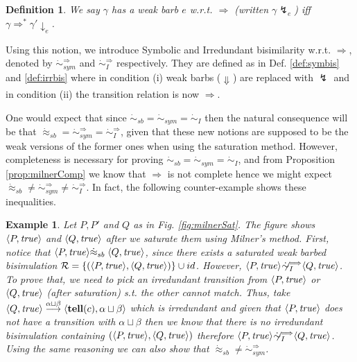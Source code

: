 \documentclass[copyright,creativecommons]{eptcs}
\newcommand{\tellp}[1]{\tell(#1)}
\newcommand{\true}{{\it true}}
\newcommand{\tell}{{\bf tell}}
\newcommand{\rrarrow}{\longrightarrow}
\newcommand{\pairccp}[2]{\langle #1,#2 \rangle}
\newcommand{\trans}[1]{\stackrel{#1}{\rrarrow}}
\newcommand{\barb}[1]{\downarrow_{#1}}
\newcommand{\wbarb}[1]{\Downarrow_{#1}}
\newcommand{\wsatbis}{\dot{\approx}_{sb}}
\newcommand{\satstbisim}{\dot{\sim}_{sb}}
\newtheorem{definition}{Definition}
\newtheorem{example}{Example}
\newcommand{\newtrans}[1]{\stackrel{#1}{\Longrightarrow}}
\newcommand{\newreds}{\Longrightarrow^*}
\newcommand{\genbarb}[1]{\lightning_{#1}}
\newcommand{\G}{\gamma}
\newcommand{\conf}[2]{\pairccp{#1}{#2}}
\newcommand{\irrbis}{\dot{\sim}_{I}}
\newcommand{\symbis}{\dot{\sim}_{sym}}
\newcommand{\newirrbis}{\dot{\sim}^{\newtrans{}}_{I}}
\newcommand{\newsymbis}{\dot{\sim}^{\newtrans{}}_{sym}}
\newcommand{\nonewirrbis}{\not \!\!\! \newirrbis}
\begin{document}
\begin{definition}
We say $\G$ has a weak barb $e$ w.r.t. $\newtrans{}$
(written $\G \genbarb{e}$) iff $\G \newreds \G' \barb{e}$.
\end{definition}




Using this notion, we introduce Symbolic and Irredundant bisimilarity
w.r.t. $\newtrans{}$, denoted by $\newsymbis$ and $\newirrbis$ respectively.
They are defined as in Def. \ref{def:symbis} and \ref{def:irrbis} where in
condition (i) weak barbs ($\wbarb{}$) are replaced with $\genbarb{}$ and in
condition (ii) the transition relation is now $\newtrans{}$.

One would expect that since $\satstbisim = \symbis = \irrbis$ then
the natural consequence will be that $\wsatbis = \newsymbis = \newirrbis$,
given that these new notions are supposed to be the weak versions of the former ones
when using the saturation method.
However, completeness is necessary for proving $\satstbisim = \symbis = \irrbis$,
and from Proposition \ref{prop:milnerComp} we know that $\newtrans{}$ is not complete
hence we might expect $\wsatbis \neq \newsymbis \neq \newirrbis$.
In fact, the following counter-example shows these inequalities.







\begin{example}
Let $P, P'$ and $Q$ as in Fig. \ref{fig:milnerSat}.
The figure shows $\conf{P}{\true}$ and $\conf{Q}{\true}$ after we saturate them using Milner's method.
First, notice that $\conf{P}{\true} \wsatbis \; \conf{Q}{\true}$,
since there exists a saturated weak barbed bisimulation {\small$\mathcal{R} =\{(\pairccp{P}
{\true},\pairccp{Q}{\true})\} \cup id$}.
However, $\conf{P}{\true} \nonewirrbis \conf{Q}{\true}$.
To prove that, we need to pick an irredundant transition from $\conf{P}{\true}$ or
$\conf{Q}{\true}$ (after saturation) s.t. the other cannot match.
Thus, take $\pairccp{Q}{\true} \trans{\alpha \sqcup \beta} \pairccp{\tellp{c}}{\alpha \sqcup \beta}$
which is irredundant and given that $\conf{P}{\true}$ does not have a transition with $\alpha \sqcup \beta$
then we know that there is no irredundant bisimulation containing $(\conf{P}{\true}, \conf{Q}{\true})$ therefore $\conf{P}{\true} \nonewirrbis \conf{Q}{\true}$.
Using the same reasoning we can also show that $\wsatbis \neq \newsymbis$.
\end{example}
\end{document}
